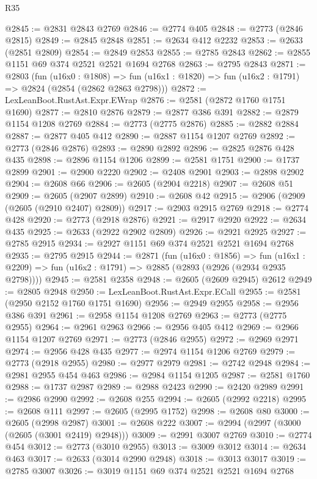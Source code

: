 \begin{lexlean}{R35}
\begin{coremodule}
@2845 := @2831 @2843 @2769
@2846 := @2774 @405
@2848 := @2773 (@2846 @2815)
@2849 := @2845 @2848
@2851 := @2634 @412 @2232
@2853 := @2633 (@2851 @2809)
@2854 := @2849 @2853
@2855 := @2785 @2843
@2862 := @2855 @1151 @69 @374 @2521 @2521 @1694 @2768
@2863 := @2795 @2843
@2871 := @2803
    (fun (u16x0 : @1808) =>
    fun (u16x1 : @1820) => fun (u16x2 : @1791) => @2824 (@2854 (@2862 @2863 @2798)))
@2872 := LexLeanBoot.RustAst.Expr.EWrap
@2876 := @2581 (@2872 @1760 @1751 @1690)
@2877 := @2810 @2876
@2879 := @2877 @386 @391
@2882 := @2879 @1154 @1208 @2769
@2884 := @2773 (@2775 @2876)
@2885 := @2882 @2884
@2887 := @2877 @405 @412
@2890 := @2887 @1154 @1207 @2769
@2892 := @2773 (@2846 @2876)
@2893 := @2890 @2892
@2896 := @2825 @2876 @428 @435
@2898 := @2896 @1154 @1206
@2899 := @2581 @1751
@2900 := @1737 @2899
@2901 := @2900 @2220
@2902 := @2408 @2901
@2903 := @2898 @2902
@2904 := @2608 @66
@2906 := @2605 (@2904 @2218)
@2907 := @2608 @51
@2909 := @2605 (@2907 @2899)
@2910 := @2608 @42
@2915 := @2906 (@2909 (@2605 (@2910 @2407) @2809))
@2917 := @2903 @2915 @2769
@2918 := @2774 @428
@2920 := @2773 (@2918 @2876)
@2921 := @2917 @2920
@2922 := @2634 @435
@2925 := @2633 (@2922 @2902 @2809)
@2926 := @2921 @2925
@2927 := @2785 @2915
@2934 := @2927 @1151 @69 @374 @2521 @2521 @1694 @2768
@2935 := @2795 @2915
@2944 := @2871
    (fun (u16x0 : @1856) =>
    fun (u16x1 : @2209) => fun (u16x2 : @1791) => @2885 (@2893 (@2926 (@2934 @2935 @2798))))
@2945 := @2581 @2358
@2948 := @2605 (@2609 @2945) @2612
@2949 := @2805 @2948
@2950 := LexLeanBoot.RustAst.Expr.ECall
@2955 := @2581 (@2950 @2152 @1760 @1751 @1690)
@2956 := @2949 @2955
@2958 := @2956 @386 @391
@2961 := @2958 @1154 @1208 @2769
@2963 := @2773 (@2775 @2955)
@2964 := @2961 @2963
@2966 := @2956 @405 @412
@2969 := @2966 @1154 @1207 @2769
@2971 := @2773 (@2846 @2955)
@2972 := @2969 @2971
@2974 := @2956 @428 @435
@2977 := @2974 @1154 @1206 @2769
@2979 := @2773 (@2918 @2955)
@2980 := @2977 @2979
@2981 := @2742 @2948
@2984 := @2981 @2955 @454 @463
@2986 := @2984 @1154 @1205
@2987 := @2581 @1760
@2988 := @1737 @2987
@2989 := @2988 @2423
@2990 := @2420 @2989
@2991 := @2986 @2990
@2992 := @2608 @255
@2994 := @2605 (@2992 @2218)
@2995 := @2608 @111
@2997 := @2605 (@2995 @1752)
@2998 := @2608 @80
@3000 := @2605 (@2998 @2987)
@3001 := @2608 @222
@3007 := @2994 (@2997 (@3000 (@2605 (@3001 @2419) @2948)))
@3009 := @2991 @3007 @2769
@3010 := @2774 @454
@3012 := @2773 (@3010 @2955)
@3013 := @3009 @3012
@3014 := @2634 @463
@3017 := @2633 (@3014 @2990 @2948)
@3018 := @3013 @3017
@3019 := @2785 @3007
@3026 := @3019 @1151 @69 @374 @2521 @2521 @1694 @2768

\end{coremodule}
\end{lexlean}
